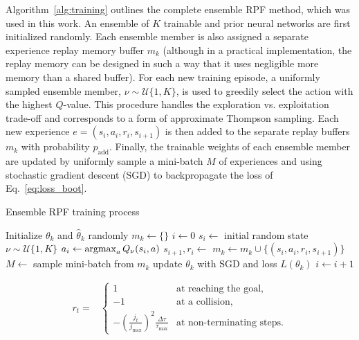 Algorithm~\ref{alg:training} outlines the complete ensemble RPF method, which was used in this work. An ensemble of $K$ trainable and prior neural networks are first initialized randomly. Each ensemble member is also assigned a separate experience replay memory buffer $m_k$ (although in a practical implementation, the replay memory can be designed in such a way that it uses negligible more memory than a shared buffer). For each new training episode, a uniformly sampled ensemble member, $\nu \sim \mathcal{U}\{1,K\}$, is used to greedily select the action with the highest $Q$-value. This procedure handles the exploration vs. exploitation trade-off and corresponds to a form of approximate Thompson sampling. Each new experience $e = (s_i, a_i, r_i, s_{i+1})$ is then added to the separate replay buffers $m_k$ with probability $p_\mathrm{add}$. Finally, the trainable weights of each ensemble member are updated by uniformly sample a mini-batch $M$ of experiences and using stochastic gradient descent (SGD) to backpropagate the loss of Eq.~\ref{eq:loss_boot}.

\begin{algorithm}[h]
	\caption{Ensemble RPF training process}\label{alg:training}
	\begin{algorithmic}[1]
			\State Initialize $\theta_k$ and $\hat{\theta}_k$ randomly
			\State $m_k \gets \{\}$
		\EndFor
		\State $i \gets 0$
			\State $s_i \gets $ initial random state
			\State $\nu \sim \mathcal{U}\{1,K\}$%
				\State $a_i \gets \operatorname*{argmax}_{a} Q_\nu(s_i,a)$
				\State $s_{i+1}, r_i \gets $ 
						\State $m_k \gets m_k \cup \{(s_i, a_i, r_i, s_{i+1})\}$
					\EndIf
					\State $M \gets $ sample mini-batch from $m_k$
					\State update $\theta_k$ with SGD and loss $L(\theta_k)$
				\EndFor
				\State $i \gets i + 1$
			\EndWhile
		\EndWhile
	\end{algorithmic}
\end{algorithm}

\begin{align*}
r_t = &\begin{cases}
1 & \text{at reaching the goal, }\\
-1 & \text{at a collision},\\
-\left(\frac{j_t}{j_{\max}}\right)^2\frac{\Delta \tau}{\tau_\mathrm{max}} & \text{at non-terminating steps.}
\end{cases} 
\end{align*}


